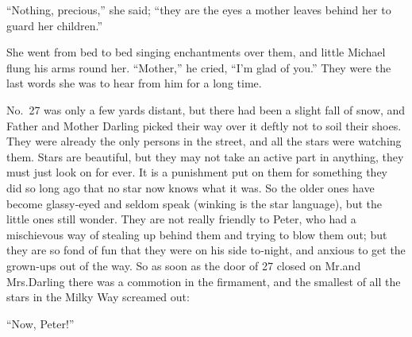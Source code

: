 “Nothing, precious,” she said;
“they are the eyes a mother leaves behind her to guard her children.”

She went from bed to bed singing enchantments over them,
and little Michael flung his arms round her.
“Mother,” he cried, “I’m glad of you.”
They were the last words she was to hear from him for a long time.

No.~27 was only a few yards distant,
but there had been a slight fall of snow,
and Father and Mother Darling picked their way over it deftly not to soil their shoes.
They were already the only persons in the street, and all the stars were watching them.
Stars are beautiful, but they may not take an active part in anything, they must just look on for ever.
It is a punishment put on them for something they did so long ago that no star now knows what it was.
So the older ones have become glassy‐eyed and seldom speak (winking is the star language),
but the little ones still wonder.
They are not really friendly to Peter,
who had a mischievous way of stealing up behind them and trying to blow them out;
but they are so fond of fun that they were on his side to‐night,
and anxious to get the grown‐ups out of the way.
So as soon as the door of 27 closed on Mr.\@ and Mrs.\@ Darling there was a commotion in the firmament,
and the smallest of all the stars in the Milky Way screamed out:

“Now, Peter!”

\endinput
